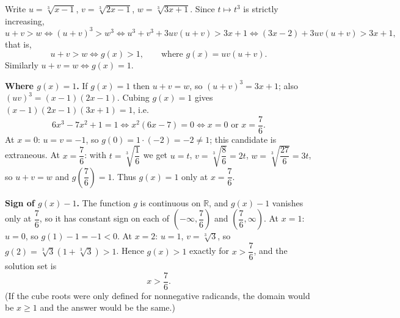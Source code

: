 Write $u=\sqrt[3]{x-1}$, $v=\sqrt[3]{2x-1}$, $w=\sqrt[3]{3x+1}$. Since $t\mapsto t^3$ is strictly increasing,
\[
u+v>w\iff(u+v)^3>w^3\iff u^3+v^3+3uv(u+v)>3x+1\iff(3x-2)+3uv(u+v)>3x+1,
\]
that is,
\[
u+v>w\iff g(x)>1,\qquad\text{where }g(x)=uv(u+v).
\]
Similarly $u+v=w\iff g(x)=1$.

\textbf{Where $g(x)=1$.} If $g(x)=1$ then $u+v=w$, so $(u+v)^3=3x+1$; also $(uv)^3=(x-1)(2x-1)$. Cubing $g(x)=1$ gives $(x-1)(2x-1)(3x+1)=1$, i.e.
\[
6x^3-7x^2+1=1\iff x^2(6x-7)=0\iff x=0\text{ or }x=\dfrac{7}{6} .
\]
At $x=0$: $u=v=-1$, so $g(0)=1\cdot(-2)=-2\ne1$; this candidate is extraneous. At $x=\dfrac{7}{6}$: with $t=\sqrt[3]{\dfrac{1}{6}}$ we get $u=t$, $v=\sqrt[3]{\dfrac{8}{6}}=2t$, $w=\sqrt[3]{\dfrac{27}{6}}=3t$, so $u+v=w$ and $g\left(\dfrac{7}{6}\right)=1$. Thus $g(x)=1$ only at $x=\dfrac{7}{6}$.

\textbf{Sign of $g(x)-1$.} The function $g$ is continuous on $\mathbb R$, and $g(x)-1$ vanishes only at $\dfrac{7}{6}$, so it has constant sign on each of $\left(-\infty,\dfrac{7}{6}\right)$ and $\left(\dfrac{7}{6},\infty\right)$. At $x=1$: $u=0$, so $g(1)-1=-1<0$. At $x=2$: $u=1$, $v=\sqrt[3]3$, so $g(2)=\sqrt[3]3\left(1+\sqrt[3]3\right)>1$. Hence $g(x)>1$ exactly for $x>\dfrac{7}{6}$, and the solution set is
\[
\boxed{x>\dfrac{7}{6}}.
\]
(If the cube roots were only defined for nonnegative radicands, the domain would be $x\ge1$ and the answer would be the same.)

